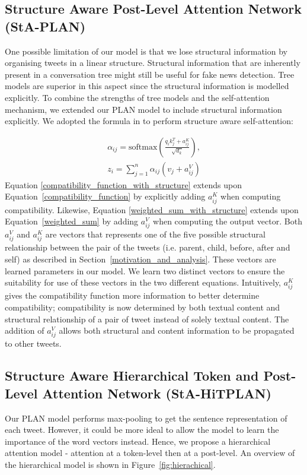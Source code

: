 \documentclass[letterpaper]{article} %
\begin{document}
\subsection{Structure Aware Post-Level Attention Network (StA-PLAN)}
\label{sec:staplan}

One possible limitation of our model is that we lose structural information by organising tweets in a linear structure. Structural information that are inherently present in a conversation tree might still be useful for fake news detection. Tree models are superior in this aspect since the structural information is modelled explicitly. To combine the strengths of tree models and the self-attention mechanism, we extended our PLAN model to include structural information explicitly. We adopted the formula in \citet{shaw-etal-2018-self} to perform structure aware self-attention:

\begin{eqnarray}
\alpha_{ij} = \mathrm{softmax}(\frac{q_{i}k_{j}^T + a_{ij}^K}{\sqrt{d_{k}}}) \label{compatibility_function_with_structure}, \\
z_i = \sum_{j=1}^{n} \alpha_{ij} (v_j + a_{ij}^V) \label{weighted_sum_with_structure}
\end{eqnarray}
Equation \ref{compatibility_function_with_structure} extends upon Equation~\ref{compatibility_function} by explicitly adding $a_{ij}^K$ when computing compatibility. Likewise, Equation \ref{weighted_sum_with_structure} extends upon Equation~\ref{weighted_sum} by adding $a_{ij}^V$ when computing the output vector.
Both $a_{ij}^V$ and $a_{ij}^K$ are vectors that represents one of the five possible structural relationship between the pair of the tweets (i.e. parent, child, before, after and self) as described in Section~\ref{motivation_and_analysis}. These vectors are learned parameters in our model. We learn two distinct vectors to ensure the suitability for use of these vectors in the two different equations.
Intuitively, $a_{ij}^K$ gives the compatibility function more information to better determine compatibility; compatibility is now determined by both textual content and structural relationship of a pair of tweet instead of solely textual content. The addition of $a_{ij}^V$ allows both structural and content information to be propagated to other tweets.

\subsection{Structure Aware Hierarchical Token and Post-Level Attention Network (StA-HiTPLAN)}
\label{sec:stahitplan}
Our PLAN model performs max-pooling to get the sentence representation of each tweet. However, it could be more ideal to allow the model to learn the importance of the word vectors instead. Hence, we propose a hierarchical attention model - attention at a token-level then at a post-level. An overview of the hierarchical model is shown in Figure~\ref{fig:hierachical}.
\end{document}

